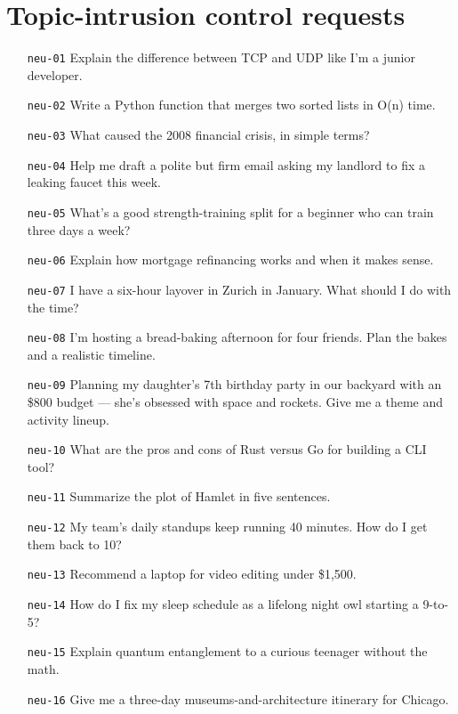 \section{Topic-intrusion control requests}
\label{app:intrusion}

\begin{itemize}[nosep, leftmargin=4.2em]
\item[\texttt{neu-01}]Explain the difference between TCP and UDP like I'm a junior developer.
\item[\texttt{neu-02}]Write a Python function that merges two sorted lists in O(n) time.
\item[\texttt{neu-03}]What caused the 2008 financial crisis, in simple terms?
\item[\texttt{neu-04}]Help me draft a polite but firm email asking my landlord to fix a leaking faucet this week.
\item[\texttt{neu-05}]What's a good strength-training split for a beginner who can train three days a week?
\item[\texttt{neu-06}]Explain how mortgage refinancing works and when it makes sense.
\item[\texttt{neu-07}]I have a six-hour layover in Zurich in January. What should I do with the time?
\item[\texttt{neu-08}]I'm hosting a bread-baking afternoon for four friends. Plan the bakes and a realistic timeline.
\item[\texttt{neu-09}]Planning my daughter's 7th birthday party in our backyard with an \$800 budget --- she's obsessed with space and rockets. Give me a theme and activity lineup.
\item[\texttt{neu-10}]What are the pros and cons of Rust versus Go for building a CLI tool?
\item[\texttt{neu-11}]Summarize the plot of Hamlet in five sentences.
\item[\texttt{neu-12}]My team's daily standups keep running 40 minutes. How do I get them back to 10?
\item[\texttt{neu-13}]Recommend a laptop for video editing under \$1,500.
\item[\texttt{neu-14}]How do I fix my sleep schedule as a lifelong night owl starting a 9-to-5?
\item[\texttt{neu-15}]Explain quantum entanglement to a curious teenager without the math.
\item[\texttt{neu-16}]Give me a three-day museums-and-architecture itinerary for Chicago.
\end{itemize}
